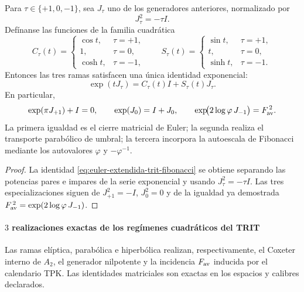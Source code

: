 \begin{corollary}
\label{cor:euler-extendida-trit-fibonacci}
Para \(\tau\in\{+1,0,-1\}\), sea \(J_\tau\) uno de los generadores
anteriores, normalizado por
\[
 J_\tau^2=-\tau I.
\]
Defínanse las funciones de la familia cuadrática
\[
 C_\tau(t)=
 \begin{cases}
  \cos t,&\tau=+1,\\
  1,&\tau=0,\\
  \cosh t,&\tau=-1,
 \end{cases}
 \qquad
 S_\tau(t)=
 \begin{cases}
  \sin t,&\tau=+1,\\
  t,&\tau=0,\\
  \sinh t,&\tau=-1.
 \end{cases}
\]
Entonces las tres ramas satisfacen una única identidad exponencial:
\begin{equation}
 \boxed{\exp(tJ_\tau)=C_\tau(t)I+S_\tau(t)J_\tau.}
 \label{eq:euler-extendida-trit-fibonacci}
\end{equation}
En particular,
\[
 \exp(\pi J_{+1})+I=0,
 \qquad
 \exp(J_0)=I+J_0,
 \qquad
 \exp\!\bigl(2\log\varphi\,J_{-1}\bigr)=F_{\rm av}^{\,2}.
\]
La primera igualdad es el cierre matricial de Euler; la segunda realiza el
transporte parabólico de umbral; la tercera incorpora la autoescala de
Fibonacci mediante los autovalores \(\varphi\) y \(-\varphi^{-1}\).
\end{corollary}

\begin{proof}
La identidad \eqref{eq:euler-extendida-trit-fibonacci} se obtiene separando
las potencias pares e impares de la serie exponencial y usando
\(J_\tau^2=-\tau I\). Las tres especializaciones siguen de
\(J_{+1}^2=-I\), \(J_0^2=0\) y de la igualdad ya demostrada
\(F_{\rm av}^{\,2}=\exp(2\log\varphi\,J_{-1})\).
\end{proof}

\paragraph{\(3\) realizaciones exactas de los regímenes cuadráticos del TRIT}
Las ramas elíptica, parabólica e hiperbólica realizan, respectivamente, el
Coxeter interno de \(A_2\), el generador nilpotente y la incidencia
\(F_{\rm av}\) inducida por el calendario TPK. Las identidades matriciales
son exactas en los espacios y calibres declarados.

